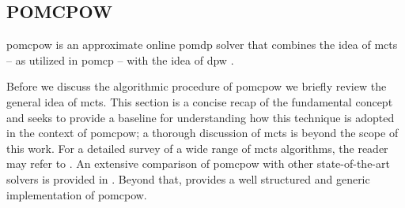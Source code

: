 % 
% 
% 

\subsection{POMCPOW}\label{sec:theory-pomcpow}

\acf{pomcpow} is an approximate online \ac{pomdp} solver that combines the idea
of \ac{mcts} -- as utilized in \ac{pomcp} \cite{silver2010pomcp} -- with the
idea of \ac{dpw} \cite{sunberg2018online}.

Before we discuss the algorithmic procedure of \ac{pomcpow} we briefly review
the general idea of \ac{mcts}. This section is a concise recap of
the fundamental concept and seeks to provide a baseline for understanding how
this technique is adopted in the context of \ac{pomcpow}; a thorough discussion
of \ac{mcts} is beyond the scope of this work. For a detailed survey of a wide
range of \ac{mcts} algorithms, the reader may refer to \cite{browne2012survey}.
An extensive comparison of \ac{pomcpow} with other state-of-the-art solvers is
provided in \cite{sunberg2018online}. Beyond that, \cite{pomcpowImpl} provides
a well structured and generic implementation of \ac{pomcpow}.

